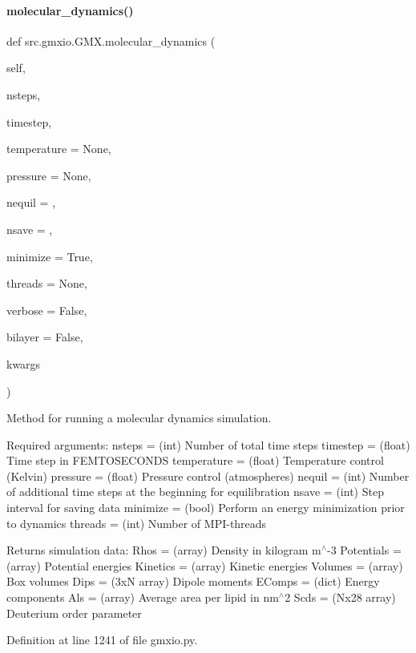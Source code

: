 \paragraph{\texorpdfstring{molecular\+\_\+dynamics()}{molecular\_dynamics()}}
{\footnotesize\ttfamily def src.\+gmxio.\+G\+M\+X.\+molecular\+\_\+dynamics (\begin{DoxyParamCaption}\item[{}]{self,  }\item[{}]{nsteps,  }\item[{}]{timestep,  }\item[{}]{temperature = {\ttfamily None},  }\item[{}]{pressure = {\ttfamily None},  }\item[{}]{nequil = {},  }\item[{}]{nsave = {},  }\item[{}]{minimize = {\ttfamily True},  }\item[{}]{threads = {\ttfamily None},  }\item[{}]{verbose = {\ttfamily False},  }\item[{}]{bilayer = {\ttfamily False},  }\item[{}]{kwargs }\end{DoxyParamCaption})}



Method for running a molecular dynamics simulation. 

Required arguments\+: nsteps = (int) Number of total time steps timestep = (float) Time step in F\+E\+M\+T\+O\+S\+E\+C\+O\+N\+DS temperature = (float) Temperature control (Kelvin) pressure = (float) Pressure control (atmospheres) nequil = (int) Number of additional time steps at the beginning for equilibration nsave = (int) Step interval for saving data minimize = (bool) Perform an energy minimization prior to dynamics threads = (int) Number of M\+P\+I-\/threads

Returns simulation data\+: Rhos = (array) Density in kilogram m$^\wedge$-\/3 Potentials = (array) Potential energies Kinetics = (array) Kinetic energies Volumes = (array) Box volumes Dips = (3xN array) Dipole moments E\+Comps = (dict) Energy components Als = (array) Average area per lipid in nm$^\wedge$2 Scds = (Nx28 array) Deuterium order parameter 

Definition at line 1241 of file gmxio.\+py.

